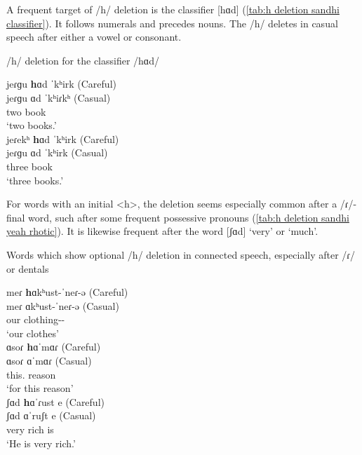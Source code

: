   	A frequent target of /h/ deletion is the classifier [hɑd] (\ref{tab:h deletion sandhi classifier}). It follows numerals and precedes nouns. The /h/ deletes in casual speech after either a vowel or consonant. 
  	
  	
  	\begin{exe}
    \ex /h/ deletion for the classifier /hɑd/ \label{tab:h deletion sandhi classifier}
    \begin{xlist}
    	\ex \glll jeɾɡu \textbf{h}ɑd ˈkʰirk (Careful)
    	\\
    	jeɾɡu ɑd ˈkʰiɾkʰ (Casual)
    	\\
    	two {\clf} book
    	\\
    	\trans `two books.' 
    	\\
    	\ex \glll jeɾekʰ \textbf{h}ɑd ˈkʰirk (Careful)
    	\\
    	jeɾɡu ɑd ˈkʰirk (Casual)
    	\\
    	three {\clf} book
    	\\
    	\trans `three books.' 
    	\\
    	
    \end{xlist}
  	\end{exe}
  	
  	
  	For words with an initial <h>, the deletion seems especially common after a /ɾ/-final word, such after some frequent possessive pronouns (\ref{tab:h deletion sandhi yeah rhotic}). It is likewise frequent after the word [ʃɑd] `very' or `much'. 
  	
  	
  	\begin{exe}
    \ex Words which show optional /h/ deletion in connected speech, especially after /ɾ/ or dentals \label{tab:h deletion sandhi yeah rhotic} 
    \begin{xlist}
    	\ex \glll meɾ \textbf{h}ɑkʰust-ˈneɾ-ə (Careful)
    	\\
    	meɾ ɑkʰust-ˈneɾ-ə (Casual)
    	\\
    	our clothing-{\pl}-{} 
    	\\
    	\trans `our clothes'
    	\\
    	\ex \glll ɑsoɾ \textbf{h}ɑˈmɑɾ (Careful)
    	\\
    	ɑsoɾ ɑˈmɑɾ (Casual)
    	\\
    	this.{\gen} reason
    	\\
    	\trans `for this reason'
    	\\
    	\ex \glll ʃɑd \textbf{h}ɑˈɾust e (Careful)
    	\\
    	ʃɑd ɑˈruʃt e (Casual)
    	\\
    	very rich is 
    	\\
    	\trans `He is very rich.'
    	\\
    \end{xlist}
  	\end{exe}
  	
